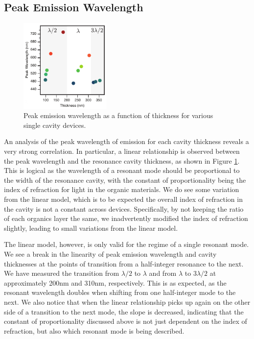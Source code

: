 \documentclass{report}
\begin{document}
        \subsection{Peak Emission Wavelength} \label{peakWavelength}
            \begin{figure}
                \centering
                \includegraphics[width=0.4\textwidth]{images/n1_peak_emission.png}
                \caption{\small Peak emission wavelength as a function of thickness for various single cavity devices.}
                \label{fig:peak_emission}
            \end{figure}

            An analysis of the peak wavelength of emission for each cavity thickness reveals a very strong correlation. In particular, a linear relationship is observed between the peak wavelength and the resonance cavity thickness, as shown in Figure \ref{fig:peak_emission}. This is logical as the wavelength of a resonant mode should be proportional to the width of the resonance cavity, with the constant of proportionality being the index of refraction for light in the organic materials. We do see some variation from the linear model, which is to be expected the overall index of refraction in the cavity is not a constant across devices. Specifically, by not keeping the ratio of each organics layer the same, we inadvertently modified the index of refraction slightly, leading to small variations from the linear model.
            
            The linear model, however, is only valid for the regime of a single resonant mode. We see a break in the linearity of peak emission wavelength and cavity thicknesses at the points of transition from a half-integer resonance to the next. We have measured the transition from $\lambda/2$ to $\lambda$ and from $\lambda$ to $3\lambda/2$ at approximately 200nm and 310nm, respectively. This is as expected, as the resonant wavelength doubles when shifting from one half-integer mode to the next. We also notice that when the linear relationship picks up again on the other side of a transition to the next mode, the slope is decreased, indicating that the constant of proportionality discussed above is not just dependent on the index of refraction, but also which resonant mode is being described.
        
\end{document}
